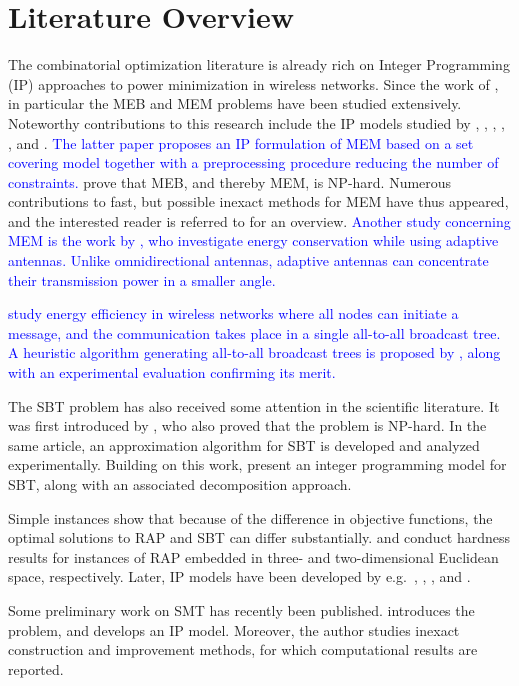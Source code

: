 \section{Literature Overview}
\label{sec:literature}

The combinatorial optimization literature is already rich on Integer Programming (IP) approaches to power minimization in wireless networks.
Since the work of \citet{Wieseltier00onthe}, in particular the MEB and MEM problems have been studied extensively.
Noteworthy contributions to this research include the IP models studied by \citet{das03},
\citet{altinkemer05}, \citet{yuan05}, \citet{yuan08}, \citet{bauer08}, \citet{montemanni11} and \citet{leggieri08}. 
\textcolor{blue}{
The latter paper proposes an IP formulation of MEM based on a set covering model together with a preprocessing procedure reducing the number of constraints.}
\citet{cagalj02} prove that MEB, and thereby MEM, is NP-hard.
Numerous contributions to fast, but possible inexact methods for MEM have thus appeared, and the interested reader is referred to \citep{hsiao13} for an overview. 
\textcolor{blue}{Another study concerning MEM is the work by \cite{guo}, who investigate energy conservation while using adaptive antennas. 
Unlike omnidirectional antennas, adaptive antennas can concentrate their transmission power in a smaller angle.}

\textcolor{blue}{\citet{bein10} study energy efficiency in wireless networks where all nodes can initiate a message, and the communication takes place in a single all-to-all broadcast tree.
A heuristic algorithm generating all-to-all broadcast trees is proposed by \citet{bhukya14}, along with an experimental evaluation confirming its merit.}

The SBT problem has also received some attention in the scientific literature.
It was first introduced by \citet{Papadimitriou06SBT}, who also proved that the problem is NP-hard.
In the same article, an approximation algorithm for SBT is developed and analyzed experimentally.
Building on this work, \citet{Haugland12Dual} present an integer programming model for SBT, along with an associated decomposition approach.

Simple instances \citep{Haugland12Dual} show that because of the difference in objective functions, the optimal solutions to RAP and SBT can differ substantially.
\citet{kirousis97} and \citet{clementi99} conduct
hardness results for instances of RAP embedded in three- and two-dimensional Euclidean space, respectively.
Later, IP models have been developed by e.g.\ \citet{althaus03}, \citet{montemanni04}, \citet{das05}, and \citet{Haugland11Compact}.

Some preliminary work on SMT has recently been published.
\citet{ivanova16isco} introduces the problem, and develops an IP model.
Moreover, the author studies inexact construction and improvement methods, for which computational results are reported.
